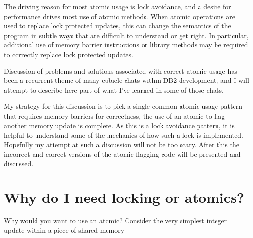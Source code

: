 The driving reason for most atomic usage is lock avoidance, and a desire for performance drives most use of atomic methods.  When atomic operations are used to replace lock protected updates, this can change the semantics of the program in subtle ways that are difficult to understand or get right.  In particular, additional use of memory barrier instructions or library methods may be required to correctly replace lock protected updates.

Discussion of problems and solutions associated with correct atomic usage has been a recurrent theme of many cubicle chats within DB2 development, and I will attempt to describe here part of what I've learned in some of those chats.

My strategy for this discussion is to pick a single common atomic usage pattern that requires memory barriers for correctness, the use of an atomic to flag another memory update is complete.  As this is a lock avoidance pattern, it is helpful to understand some of the mechanics of how such a lock is implemented.  Hopefully my attempt at such a discussion will not be too scary.  After this the incorrect and correct versions of the atomic flagging code will be presented and discussed.


\section{Why do I need locking or atomics?}

Why would you want to use an atomic?  Consider the very simplest integer update within a piece of shared memory

